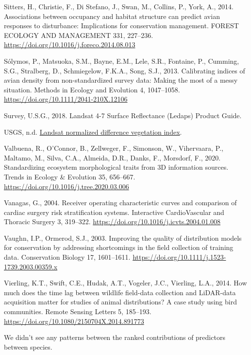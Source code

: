 \documentclass[
]{article}
\newlength{\cslhangindent}
\newlength{\cslentryspacingunit} %
\newenvironment{CSLReferences}[2] %
 {%
  \setlength{\parindent}{0pt}
  \ifodd #1
  \let\oldpar\par
  \def\par{\hangindent=\cslhangindent\oldpar}
  \fi
  \setlength{\parskip}{#2\cslentryspacingunit}
 }%
 {}
\begin{document}
\begin{CSLReferences}{1}{0}
\leavevmode{}%
Sitters, H., Christie, F., Di Stefano, J., Swan, M., Collins, P., York, A., 2014. Associations between occupancy and habitat structure can predict avian responses to disturbance: {Implications} for conservation management. FOREST ECOLOGY AND MANAGEMENT 331, 227--236. \url{https://doi.org/10.1016/j.foreco.2014.08.013}

\leavevmode{}%
Sólymos, P., Matsuoka, S.M., Bayne, E.M., Lele, S.R., Fontaine, P., Cumming, S.G., Stralberg, D., Schmiegelow, F.K.A., Song, S.J., 2013. Calibrating indices of avian density from non-standardized survey data: {Making} the most of a messy situation. Methods in Ecology and Evolution 4, 1047--1058. \url{https://doi.org/10.1111/2041-210X.12106}

\leavevmode{}%
Survey, U.S.G., 2018. Landsat 4-7 {Surface} {Reflectance} ({Ledaps}) {Product} {Guide}.

\leavevmode{}%
USGS, n.d. \href{https://www.usgs.gov/land-resources/nli/landsat/landsat-normalized-difference-vegetation-index?qt-science_support_page_related_con=0\#qt-science_support_page_related_con}{Landsat normalized difference vegetation index}.

\leavevmode{}%
Valbuena, R., O'Connor, B., Zellweger, F., Simonson, W., Vihervaara, P., Maltamo, M., Silva, C.A., Almeida, D.R., Danks, F., Morsdorf, F., 2020. Standardizing ecosystem morphological traits from {3D} information sources. Trends in Ecology \& Evolution 35, 656--667. \url{https://doi.org/10.1016/j.tree.2020.03.006}

\leavevmode{}%
Vanagas, G., 2004. Receiver operating characteristic curves and comparison of cardiac surgery risk stratification systems. Interactive CardioVascular and Thoracic Surgery 3, 319--322. \url{https://doi.org/10.1016/j.icvts.2004.01.008}

\leavevmode{}%
Vaughn, I.P., Ormerod, S.J., 2003. Improving the quality of distribution models for conservation by addressing shortcomings in the field collection of training data. Conservation Biology 17, 1601--1611. \url{https://doi.org/10.1111/j.1523-1739.2003.00359.x}

\leavevmode{}%
Vierling, K.T., Swift, C.E., Hudak, A.T., Vogeler, J.C., Vierling, L.A., 2014. How much does the time lag between wildlife field-data collection and {LiDAR}-data acquisition matter for studies of animal distributions? {A} case study using bird communities. Remote Sensing Letters 5, 185--193. \url{https://doi.org/10.1080/2150704X.2014.891773}

\end{CSLReferences}

\pagebreak

We didn't see any patterns between the ranked contributions of predictors between species.
\end{document}
